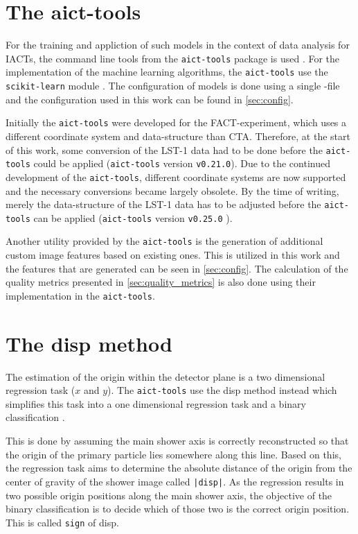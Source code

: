 \section{The aict-tools}
For the training and appliction of such models in the context of data analysis for IACTs, the command line tools from the \texttt{aict-tools} package is used \cite{aict-tools}. 
For the implementation of the machine learning algorithms, the \texttt{aict-tools} use the \texttt{scikit-learn} module \cite{scikit-learn}.
The configuration of models is done using a single -file and the configuration used in this work can be found in \autoref{sec:config}.

Initially the \texttt{aict-tools} were developed for the FACT-experiment, which uses a different coordinate system and data-structure than CTA.
Therefore, at the start of this work, some conversion of the LST-1 data had to be done before the \texttt{aict-tools} could be applied 
(\texttt{aict-tools} version \texttt{v0.21.0}).
Due to the continued development of the \texttt{aict-tools}, different coordinate systems are now supported and the necessary conversions became largely obsolete.
By the time of writing, merely the data-structure of the LST-1 data has to be adjusted before the \texttt{aict-tools} can be applied 
(\texttt{aict-tools} version \texttt{v0.25.0} \cite{aict-tools}).

Another utility provided by the \texttt{aict-tools} is the generation of additional custom image features based on existing ones.
This is utilized in this work and the features that are generated can be seen in \autoref{sec:config}. 
The calculation of the quality metrics presented in \autoref{sec:quality_metrics} is also done using their implementation in the \texttt{aict-tools}.


\section{The disp method}
The estimation of the origin within the detector plane is a two dimensional regression task ($x$ and $y$).
The \texttt{aict-tools} use the disp method instead which simplifies this task into a one dimensional regression task and a binary classification \cite{max}.

This is done by assuming the main shower axis is correctly reconstructed so that the origin of the primary particle lies somewhere along this line.
Based on this, the regression task aims to determine the absolute distance of the origin from the center of gravity of the shower image called \texttt{|disp|}.
As the regression results in two possible origin positions along the main shower axis, the objective of the binary classification is to decide which
of those two is the correct origin position.
This is called \texttt{sign} of disp.
